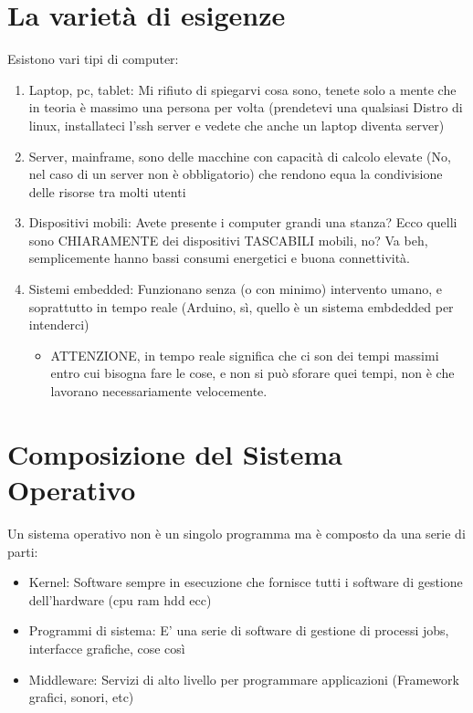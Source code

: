 \documentclass[12pt, a4paper, openany, twoside]{book}
\begin{document}
\section{La varietà di esigenze}
Esistono vari tipi di computer:
\begin{enumerate}
	\item Laptop, pc, tablet: Mi rifiuto di spiegarvi cosa sono, tenete solo
	a mente che in teoria è massimo una persona per volta (prendetevi una 
	qualsiasi Distro di linux, installateci l'ssh server e vedete che anche un 
	laptop diventa server)
	\item Server, mainframe, sono delle macchine con capacità di calcolo elevate
	(No, nel caso di un server non è obbligatorio) che rendono equa la 
	condivisione delle risorse tra molti utenti
	\item Dispositivi mobili: Avete presente i computer grandi una stanza? Ecco
	quelli sono CHIARAMENTE dei dispositivi TASCABILI mobili, no? Va beh, 
	semplicemente hanno bassi consumi energetici e buona connettività.
	\item Sistemi embedded: Funzionano senza (o con minimo) intervento umano, e
	soprattutto in tempo reale (Arduino, sì, quello è un sistema embdedded per 
	intenderci)
	\begin{itemize}
		\item ATTENZIONE, in tempo reale significa che ci son dei tempi massimi
		entro cui bisogna fare le cose, e non si può sforare quei tempi, non è
		che lavorano necessariamente velocemente.
	\end{itemize}
\end{enumerate}
\section{Composizione del Sistema Operativo}
Un sistema operativo non è un singolo programma ma è composto da una serie di 
parti:
\begin{itemize}
	\item Kernel: Software sempre in esecuzione che fornisce tutti i software
	di gestione dell'hardware (cpu ram hdd ecc)
	\item Programmi di sistema: E' una serie di software di gestione di processi
	jobs, interfacce grafiche, cose così
	\item Middleware: Servizi di alto livello per programmare applicazioni 
	(Framework grafici, sonori, etc)
\end{itemize}
\end{document}
